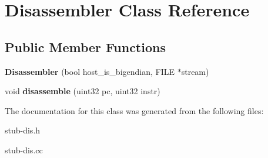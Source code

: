 \hypertarget{classDisassembler}{
\section{Disassembler Class Reference}
\label{classDisassembler}
}
\subsection*{Public Member Functions}
\begin{DoxyCompactItemize}
\item 
\hypertarget{classDisassembler_adae55d4f2ea0e1e676109cb29100f396}{
{\bfseries Disassembler} (bool host\_\-is\_\-bigendian, FILE $\ast$stream)}
\label{classDisassembler_adae55d4f2ea0e1e676109cb29100f396}

\item 
\hypertarget{classDisassembler_aa45c52f0704884adb330b4c1c052d5b7}{
void {\bfseries disassemble} (uint32 pc, uint32 instr)}
\label{classDisassembler_aa45c52f0704884adb330b4c1c052d5b7}

\end{DoxyCompactItemize}


The documentation for this class was generated from the following files:\begin{DoxyCompactItemize}
\item 
stub-\/dis.h\item 
stub-\/dis.cc\end{DoxyCompactItemize}
